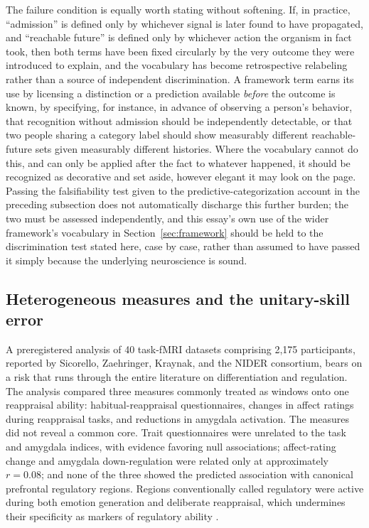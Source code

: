 \documentclass[11pt]{article}
\begin{document}
The failure condition is equally worth stating without softening. If, in practice, ``admission'' is defined only by whichever signal is later found to have propagated, and ``reachable future'' is defined only by whichever action the organism in fact took, then both terms have been fixed circularly by the very outcome they were introduced to explain, and the vocabulary has become retrospective relabeling rather than a source of independent discrimination. A framework term earns its use by licensing a distinction or a prediction available \emph{before} the outcome is known, by specifying, for instance, in advance of observing a person's behavior, that recognition without admission should be independently detectable, or that two people sharing a category label should show measurably different reachable-future sets given measurably different histories. Where the vocabulary cannot do this, and can only be applied after the fact to whatever happened, it should be recognized as decorative and set aside, however elegant it may look on the page. Passing the falsifiability test given to the predictive-categorization account in the preceding subsection does not automatically discharge this further burden; the two must be assessed independently, and this essay's own use of the wider framework's vocabulary in Section~\ref{sec:framework} should be held to the discrimination test stated here, case by case, rather than assumed to have passed it simply because the underlying neuroscience is sound.

\subsection{Heterogeneous measures and the unitary-skill error}\label{sub:measures}

A preregistered analysis of 40 task-fMRI datasets comprising 2,175 participants, reported by Sicorello, Zaehringer, Kraynak, and the NIDER consortium, bears on a risk that runs through the entire literature on differentiation and regulation. The analysis compared three measures commonly treated as windows onto one reappraisal ability: habitual-reappraisal questionnaires, changes in affect ratings during reappraisal tasks, and reductions in amygdala activation. The measures did not reveal a common core. Trait questionnaires were unrelated to the task and amygdala indices, with evidence favoring null associations; affect-rating change and amygdala down-regulation were related only at approximately $r=0.08$; and none of the three showed the predicted association with canonical prefrontal regulatory regions. Regions conventionally called regulatory were active during both emotion generation and deliberate reappraisal, which undermines their specificity as markers of regulatory ability \citep{Sicorello2026}.
\end{document}
